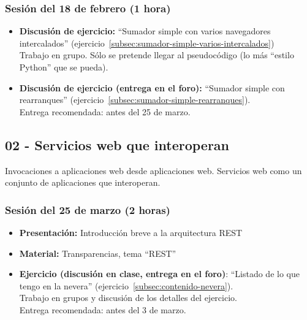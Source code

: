 \documentclass[a4paper,12pt]{article}
\begin{document}
\subsubsection{Sesión del 18 de febrero (1 hora)}

\begin{itemize}
\item \textbf{Discusión de ejercicio:} ``Sumador simple con varios 
navegadores intercalados'' (ejercicio~\ref{subsec:sumador-simple-varios-intercalados}) \\
  Trabajo en grupo. Sólo se pretende llegar al pseudocódigo (lo más ``estilo Python'' que se pueda).
\item \textbf{Discusión de ejercicio (entrega en el foro):} ``Sumador simple con rearranques'' (ejercicio~\ref{subsec:sumador-simple-rearranques}). \\
 Entrega recomendada: antes del 25 de marzo.
\end{itemize}

\subsection{02 - Servicios web que interoperan}


Invocaciones a aplicaciones web desde aplicaciones web. Servicios web como un conjunto de aplicaciones que interoperan.

\subsubsection{Sesión del 25 de marzo (2 horas)}

\begin{itemize}
\item \textbf{Presentación:} Introducción breve a la arquitectura REST
\item \textbf{Material:} Transparencias, tema ``REST''
\item \textbf{Ejercicio (discusión en clase, entrega en el foro)}: ``Listado de lo que tengo en la nevera'' (ejercicio~\ref{subsec:contenido-nevera}). \\
  Trabajo en grupos y discusión de los detalles del ejercicio. \\
  Entrega recomendada: antes del 3 de marzo.
\end{itemize}
\end{document}
